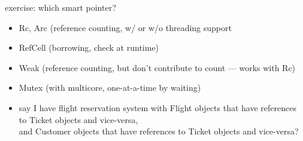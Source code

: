 \begin{frame}{exercise: which smart pointer?}
    \begin{itemize}
    \item Rc, Arc (reference counting, w/ or w/o threading support
    \item RefCell (borrowing, check at runtime)
    \item Weak (reference counting, but don't contribute to count --- works with Rc)
    \item Mutex (with multicore, one-at-a-time by waiting)
    \vspace{.5cm}
    \item say I have flight reservation system with Flight objects that have
        references to Ticket objects and vice-versa, \\
        and Customer objects that have references to Ticket objects and vice-versa?
    \end{itemize}
\end{frame}
